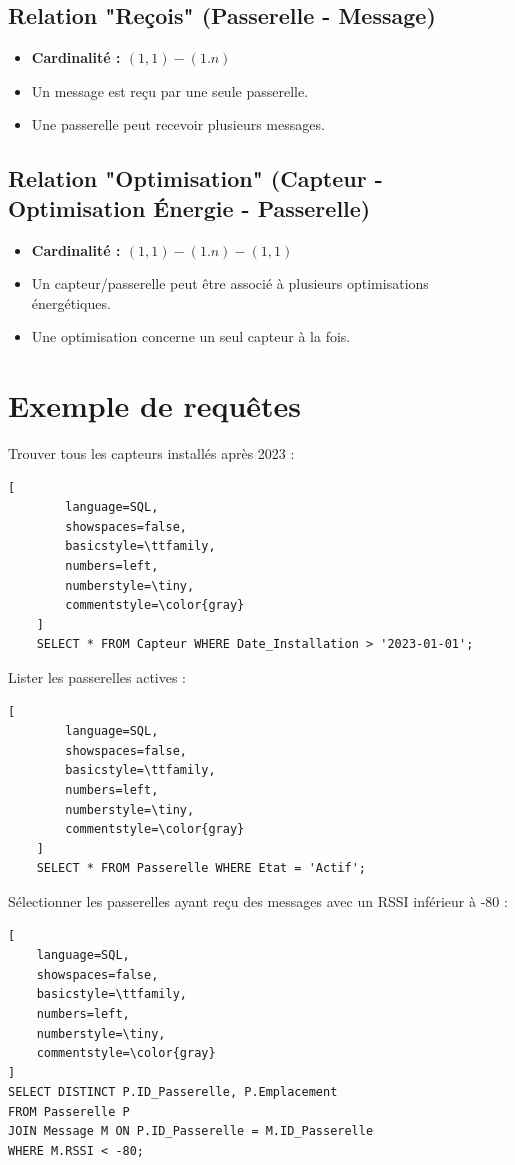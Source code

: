 \documentclass[
	a4paper, %
	11pt, %
	unnumberedsections, %
	twoside, %
    xcolor = {dvipsnames}
]{class}
\begin{document}
\subsection{Relation "Re\c{c}ois" (Passerelle - Message)}
\begin{itemize}
\item \textbf{Cardinalité : \((1,1) - (1.n)\)}
\item Un message est reçu par une seule passerelle.
\item Une passerelle peut recevoir plusieurs messages.
\end{itemize}

\subsection{Relation "Optimisation" (Capteur - Optimisation Énergie - Passerelle)}
\begin{itemize}
\item \textbf{Cardinalité : \((1,1) - (1.n) - (1,1)\)}
\item Un capteur/passerelle peut être associé à plusieurs optimisations énergétiques.
\item Une optimisation concerne un seul capteur à la fois.
\end{itemize}

\section{Exemple de requêtes}

Trouver tous les capteurs installés après 2023 :
\begin{lstlisting}[
        language=SQL,
        showspaces=false,
        basicstyle=\ttfamily,
        numbers=left,
        numberstyle=\tiny,
        commentstyle=\color{gray}
    ]
    SELECT * FROM Capteur WHERE Date_Installation > '2023-01-01';
\end{lstlisting}
\noindent
Lister les passerelles actives :
\begin{lstlisting}[
        language=SQL,
        showspaces=false,
        basicstyle=\ttfamily,
        numbers=left,
        numberstyle=\tiny,
        commentstyle=\color{gray}
    ]
    SELECT * FROM Passerelle WHERE Etat = 'Actif';
\end{lstlisting}

\noindent
Sélectionner les passerelles ayant reçu des messages avec un RSSI inférieur à -80 :
\begin{lstlisting}[
    language=SQL,
    showspaces=false,
    basicstyle=\ttfamily,
    numbers=left,
    numberstyle=\tiny,
    commentstyle=\color{gray}
]
SELECT DISTINCT P.ID_Passerelle, P.Emplacement 
FROM Passerelle P
JOIN Message M ON P.ID_Passerelle = M.ID_Passerelle
WHERE M.RSSI < -80;
\end{lstlisting}
\end{document}
